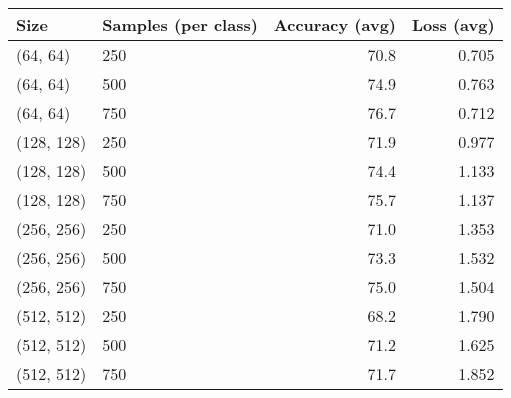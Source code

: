 \begin{tabular}{llrr}
\toprule
      Size & Samples (per class) &  Accuracy (avg) &  Loss (avg) \\
\midrule
  (64, 64) &                 250 &            70.8 &       0.705 \\
  (64, 64) &                 500 &            74.9 &       0.763 \\
  (64, 64) &                 750 &            76.7 &       0.712 \\
(128, 128) &                 250 &            71.9 &       0.977 \\
(128, 128) &                 500 &            74.4 &       1.133 \\
(128, 128) &                 750 &            75.7 &       1.137 \\
(256, 256) &                 250 &            71.0 &       1.353 \\
(256, 256) &                 500 &            73.3 &       1.532 \\
(256, 256) &                 750 &            75.0 &       1.504 \\
(512, 512) &                 250 &            68.2 &       1.790 \\
(512, 512) &                 500 &            71.2 &       1.625 \\
(512, 512) &                 750 &            71.7 &       1.852 \\
\bottomrule
\end{tabular}

